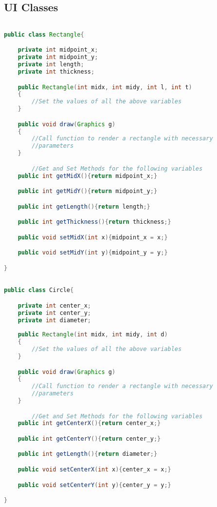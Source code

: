 \documentclass{article}
\begin{document}
\subsection{UI Classes}

\begin{lstlisting}[language=Java, caption={Class Parameters for Rectangle}]

public class Rectangle{

	private int midpoint_x;
	private int midpoint_y;
	private int length;
	private int thickness;

	public Rectangle(int midx, int midy, int l, int t)
	{
		//Set the values of all the above variables
	}

	public void draw(Graphics g) 
	{
		//Call function to render a rectangle with necessary
		//parameters
    }

    	//Get and Set Methods for the following variables
	public int getMidX(){return midpoint_x;}

	public int getMidY(){return midpoint_y;}

	public int getLength(){return length;}

	public int getThickness(){return thickness;}

	public void setMidX(int x){midpoint_x = x;}

	public void setMidY(int y){midpoint_y = y;}

}
\end{lstlisting}

\begin{lstlisting}[language=Java, caption={Class Parameters for Circle}]

public class Circle{

	private int center_x;
	private int center_y;
	private int diameter;
	
	public Rectangle(int midx, int midy, int d)
	{
		//Set the values of all the above variables
	}

	public void draw(Graphics g) 
	{
		//Call function to render a rectangle with necessary 
		//parameters
    }

    	//Get and Set Methods for the following variables
	public int getCenterX(){return center_x;}

	public int getCenterY(){return center_y;}

	public int getLength(){return diameter;}

	public void setCenterX(int x){center_x = x;}

	public void setCenterY(int y){center_y = y;}

}
\end{lstlisting}
\end{document}
